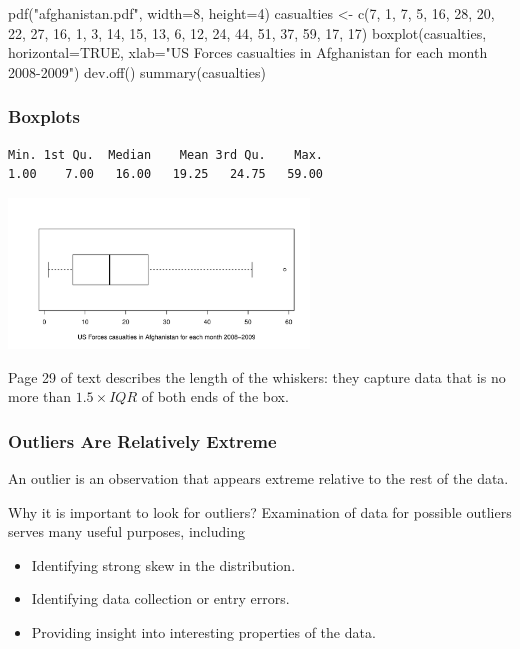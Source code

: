 \documentclass[handout]{beamer}
\newcommand{\blue}[1]{\textcolor{blue2}{#1}}
\begin{document}
pdf("afghanistan.pdf", width=8, height=4)
casualties <- c(7, 1, 7, 5, 16, 28, 20, 22, 27, 16, 1, 3, 14, 15, 13, 6, 12, 24, 44, 51, 37, 59, 17, 17)
boxplot(casualties, horizontal=TRUE, xlab="US Forces casualties in Afghanistan for each month 2008-2009")
dev.off()
summary(casualties)
\begin{frame}[fragile]
\frametitle{Boxplots}
\begin{verbatim}
Min. 1st Qu.  Median    Mean 3rd Qu.    Max. 
1.00    7.00   16.00   19.25   24.75   59.00 
\end{verbatim}
\begin{center}
\includegraphics[height=4cm]{figure/afghanistan.pdf}
\end{center}
\pause Page 29 of text describes the length of the \blue{whiskers}: they capture data that is no more than $1.5 \times IQR$ of both ends of the box.  

\end{frame}


\begin{frame}
\frametitle{Outliers Are Relatively Extreme}
An \blue{outlier} is an observation that appears extreme relative to the rest of the data.

\vspace{0.5cm}

\pause Why it is important to look for outliers?  Examination of data for possible outliers serves many useful purposes, including
\begin{itemize}
\pause\item Identifying strong skew in the distribution.
\pause\item Identifying data collection or entry errors.
\pause\item Providing insight into interesting properties of the data.
\end{itemize}

\end{frame}
\end{document}
